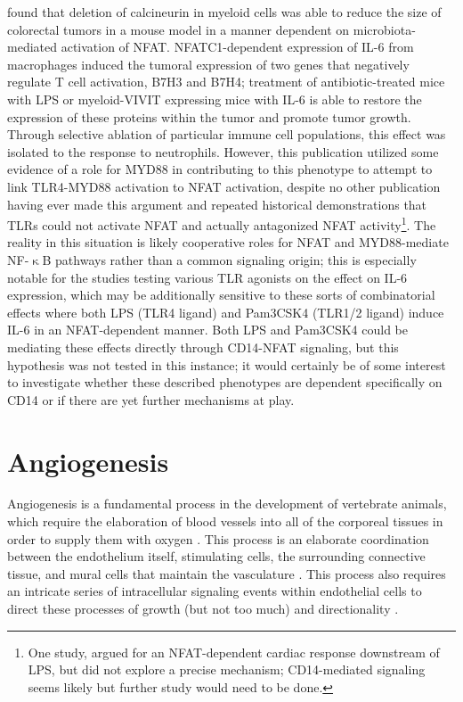 \citet{Peuker2022} found that deletion of calcineurin in myeloid cells was able to reduce the size of colorectal tumors in a mouse model in a manner dependent on microbiota\hyp{}mediated activation of NFAT. NFATC1\hyp{}dependent expression of IL\hyp{}6 from macrophages induced the tumoral expression of two genes that negatively regulate T cell activation, B7H3 and B7H4; treatment of antibiotic\hyp{}treated mice with LPS or myeloid\hyp{}VIVIT expressing mice with IL\hyp{}6 is able to restore the expression of these proteins within the tumor and promote tumor growth. Through selective ablation of particular immune cell populations, this effect was isolated to the response to neutrophils. However, this publication utilized some evidence of a role for MYD88 in contributing to this phenotype to attempt to link TLR4\hyp{}MYD88 activation to NFAT activation, despite no other publication having ever made this argument and repeated historical demonstrations that TLRs could not activate NFAT and actually antagonized NFAT activity\footnote{One study, \citet{Liu2008a} argued for an NFAT\hyp{}dependent cardiac response downstream of LPS, but did not explore a precise mechanism; CD14\hyp{}mediated signaling seems likely but further study would need to be done.}. The reality in this situation is likely cooperative roles for NFAT and MYD88\hyp{}mediate NF\hyp{}$\upkappa$B pathways rather than a common signaling origin; this is especially notable for the studies testing various TLR agonists on the effect on IL\hyp{}6 expression, which may be additionally sensitive to these sorts of combinatorial effects where both LPS (TLR4 ligand) and Pam3CSK4 (TLR1/2 ligand) induce IL\hyp{}6 in an NFAT\hyp{}dependent manner. Both LPS and Pam3CSK4 could be mediating these effects directly through CD14\hyp{}NFAT signaling, but this hypothesis was not tested in this instance; it would certainly be of some interest to investigate whether these described phenotypes are dependent specifically on CD14 or if there are yet further mechanisms at play. 

\section{Angiogenesis}\label{angiogenesis}

Angiogenesis is a fundamental process in the development of vertebrate animals, which require the elaboration of blood vessels into all of the corporeal tissues in order to supply them with oxygen \citep{Adams2007, Carmeliet2011}. This process is an elaborate coordination between the endothelium itself, stimulating cells, the surrounding connective tissue, and mural cells that maintain the vasculature \citep{Armulik2011, Stratman2017}. This process also requires an intricate series of intracellular signaling events within endothelial cells to direct these processes of growth (but not too much) and directionality \citep{Simons2016}.

